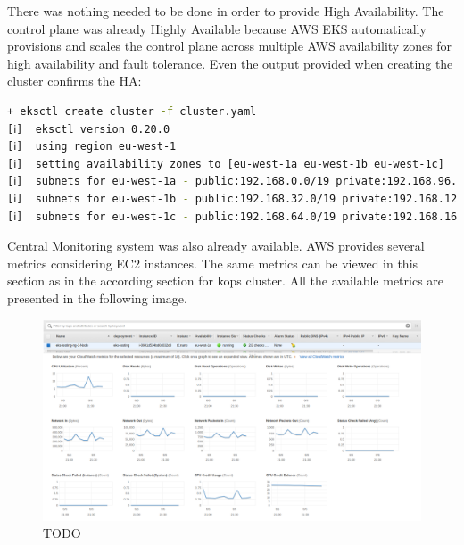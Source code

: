 There was nothing needed to be done in order to provide High Availability. The control plane was already Highly Available because AWS EKS automatically provisions and scales the control plane across multiple AWS availability zones for high availability and fault tolerance\cite{eks-faqs}. Even the output provided when creating the cluster confirms the HA:
\begin{lstlisting}[basicstyle=\tiny,caption={TODO},captionpos=b,language=Bash,xleftmargin=1cm]
+ eksctl create cluster -f cluster.yaml
[ℹ]  eksctl version 0.20.0
[ℹ]  using region eu-west-1
[ℹ]  setting availability zones to [eu-west-1a eu-west-1b eu-west-1c]
[ℹ]  subnets for eu-west-1a - public:192.168.0.0/19 private:192.168.96.0/19
[ℹ]  subnets for eu-west-1b - public:192.168.32.0/19 private:192.168.128.0/19
[ℹ]  subnets for eu-west-1c - public:192.168.64.0/19 private:192.168.160.0/19
\end{lstlisting}

Central Monitoring system was also already available. AWS provides several metrics considering EC2 instances. The same metrics can be viewed in this section as in the according section for kops cluster. All the available metrics are presented in the following image.
\begin{figure}[H]
    \centering
    \includegraphics[width=17cm]{figures/eks-monitoring-ec2-node.png}
    \captionsetup{justification=centering,margin=2cm}
    \caption{TODO}
\end{figure}


